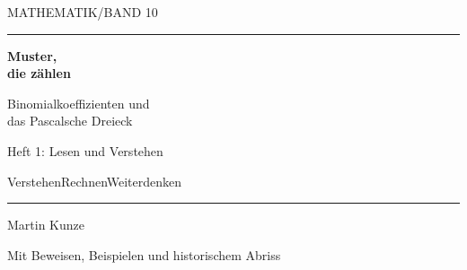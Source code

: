 \documentclass[a4paper,10pt]{article}
\begin{document}
\hypertarget{binomial.reading}{}
{\sffamily\small MATHEMATIK\quad /\quad BAND 10}\par
\vspace{3mm}\hrule\vspace{9mm}
{\fontsize{29}{32}\selectfont\bfseries Muster,\\die zählen\par}
\vspace{6mm}
{\Large Binomialkoeffizienten und\\das Pascalsche Dreieck\par}
\vspace{3mm}
{\normalsize Heft 1: Lesen und Verstehen\par}
\vspace{6mm}
\begin{center}\end{center}
\vfill
{\sffamily\small Verstehen\quad\textbullet\quad Rechnen\quad\textbullet\quad Weiterdenken\par}
\vspace{5mm}\hrule\vspace{3mm}
{\large Martin Kunze\par}
{\small Mit Beweisen, Beispielen und historischem Abriss\par}
\clearpage


\end{document}
